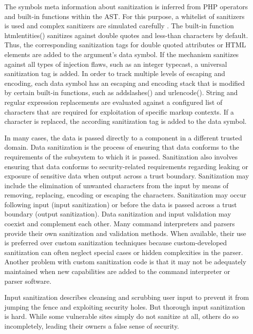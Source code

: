 The symbols meta information about sanitization is inferred
from PHP operators and built-in functions within the
AST. For this purpose, a whitelist of sanitizers is used and
complex sanitizers are simulated carefully \cite{ref_93_dahse2014simulation}. The built-in function htmlentities() sanitizes
against double quotes and less-than characters by default.
Thus, the corresponding sanitization tags for double quoted
attributes or HTML elements are added to the argument's
data symbol. If the mechanism sanitizes against all
types of injection flaws, such as an integer typecast, a universal
sanitization tag is added. In order to track multiple levels
of escaping and encoding, each data symbol has an escaping
and encoding stack that is modified by certain built-in
functions, such as addslashes() and urlencode(). String
and regular expression replacements are evaluated against a
configured list of characters that are required for exploitation
of specific markup contexts. If a character is replaced,
the according sanitization tag is added to the data symbol.


In many cases, the data is passed directly to a component in a different trusted domain. Data sanitization is the process of ensuring that data conforms to the requirements of the subsystem to which it is passed. Sanitization also involves ensuring that data conforms to security-related requirements regarding leaking or exposure of sensitive data when output across a trust boundary. Sanitization may include the elimination of unwanted characters from the input by means of removing, replacing, encoding or escaping the characters. Sanitization may occur following input (input sanitization) or before the data is passed across a trust boundary (output sanitization). Data sanitization and input validation may coexist and complement each other. Many command interpreters and parsers provide their own sanitization and validation methods. When available, their use is preferred over custom sanitization techniques because custom-developed sanitization can often neglect special cases or hidden complexities in the parser. Another problem with custom sanitization code is that it may not be adequately maintained when new capabilities are added to the command interpreter or parser software.

Input sanitization describes cleansing and scrubbing user input to prevent it from jumping the fence and exploiting security holes. But thorough input sanitization is hard. While some vulnerable sites simply do not sanitize at all, others do so incompletely, leading their owners a false sense of security.

